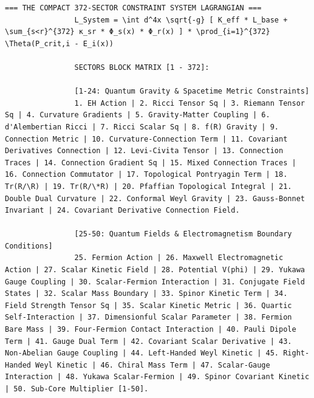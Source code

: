 \documentclass[11pt,a4paper]{article}
\makeatletter
\def\ttfamily{\@noligs\fontfamily\ttdefault\selectfont\sloppy}
\makeatother
\begin{document}
\begin{tcolorbox}
\begin{otherlanguage}{english}
\begin{lstlisting}[basicstyle=\scriptsize\ttfamily, breaklines=true, columns=fullflexible]
				=== THE COMPACT 372-SECTOR CONSTRAINT SYSTEM LAGRANGIAN ===
				L_System = \int d^4x \sqrt{-g} [ K_eff * L_base + \sum_{s<r}^{372} κ_sr * Φ_s(x) * Φ_r(x) ] * \prod_{i=1}^{372} \Theta(P_crit,i - E_i(x))
				
				SECTORS BLOCK MATRIX [1 - 372]:
				
				[1-24: Quantum Gravity & Spacetime Metric Constraints]
				1. EH Action | 2. Ricci Tensor Sq | 3. Riemann Tensor Sq | 4. Curvature Gradients | 5. Gravity-Matter Coupling | 6. d'Alembertian Ricci | 7. Ricci Scalar Sq | 8. f(R) Gravity | 9. Connection Metric | 10. Curvature-Connection Term | 11. Covariant Derivatives Connection | 12. Levi-Civita Tensor | 13. Connection Traces | 14. Connection Gradient Sq | 15. Mixed Connection Traces | 16. Connection Commutator | 17. Topological Pontryagin Term | 18. Tr(R/\R) | 19. Tr(R/\*R) | 20. Pfaffian Topological Integral | 21. Double Dual Curvature | 22. Conformal Weyl Gravity | 23. Gauss-Bonnet Invariant | 24. Covariant Derivative Connection Field.
				
				[25-50: Quantum Fields & Electromagnetism Boundary Conditions]
				25. Fermion Action | 26. Maxwell Electromagnetic Action | 27. Scalar Kinetic Field | 28. Potential V(phi) | 29. Yukawa Gauge Coupling | 30. Scalar-Fermion Interaction | 31. Conjugate Field States | 32. Scalar Mass Boundary | 33. Spinor Kinetic Term | 34. Field Strength Tensor Sq | 35. Scalar Kinetic Metric | 36. Quartic Self-Interaction | 37. Dimensionful Scalar Parameter | 38. Fermion Bare Mass | 39. Four-Fermion Contact Interaction | 40. Pauli Dipole Term | 41. Gauge Dual Term | 42. Covariant Scalar Derivative | 43. Non-Abelian Gauge Coupling | 44. Left-Handed Weyl Kinetic | 45. Right-Handed Weyl Kinetic | 46. Chiral Mass Term | 47. Scalar-Gauge Interaction | 48. Yukawa Scalar-Fermion | 49. Spinor Covariant Kinetic | 50. Sub-Core Multiplier [1-50].
				

\end{lstlisting}
\end{otherlanguage}
\end{tcolorbox}
\end{document}
